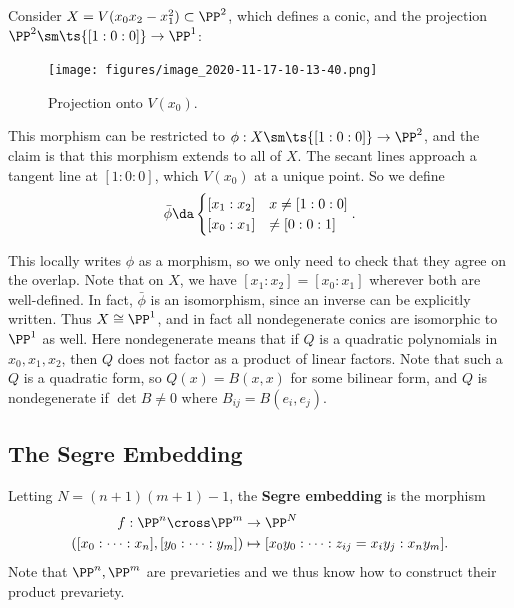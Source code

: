 \begin{example}[?]

Consider \(X = V(x_0 x_2 - x_1^2) \subset \PP^2\), which defines a
conic, and the projection \(\PP^2 \sm \ts{[1:0:0]} \to \PP^1\):

\begin{figure}
\centering
\texttt{[image: figures/image\_2020-11-17-10-13-40.png]}
\caption{Projection onto \(V(x_0)\).}
\end{figure}

This morphism can be restricted to \(\phi: X\sm\ts{[1:0:0]} \to \PP^2\),
and the claim is that this morphism extends to all of \(X\). The secant
lines approach a tangent line at \([1:0:0]\), which \(V(x_0)\) at a
unique point. So we define
\begin{align*}  
\bar \phi \da 
\begin{cases}
[x_1: x_2] & x \neq [1:0:0] \\
[x_0: x_1] & \neq [0:0:1]
\end{cases}
.\end{align*}

This locally writes \(\phi\) as a morphism, so we only need to check
that they agree on the overlap. Note that on \(X\), we have
\([x_1: x_2] = [x_0 : x_1]\) wherever both are well-defined. In fact,
\(\bar \phi\) is an isomorphism, since an inverse can be explicitly
written. Thus \(X\cong \PP^1\), and in fact all nondegenerate conics are
isomorphic to \(\PP^1\) as well. Here nondegenerate means that if \(Q\)
is a quadratic polynomials in \(x_0, x_1, x_2\), then \(Q\) does not
factor as a product of linear factors. Note that such a \(Q\) is a
quadratic form, so \(Q(x) = B(x, x)\) for some bilinear form, and \(Q\)
is nondegenerate if \(\det B \neq 0\) where \(B_{ij} = B(e_i, e_j)\).

\end{example}

\hypertarget{the-segre-embedding}{%
\subsection{The Segre Embedding}\label{the-segre-embedding}}

\begin{definition}

Letting \(N = (n+1)(m+1) - 1\), the \textbf{Segre embedding} is the
morphism
\begin{align*}  
f: \PP^n \cross \PP^m &\to \PP^N \\
([x_0: \cdots : x_n], [y_0: \cdots : y_m]) &\mapsto
[x_0 y_0 : \cdots : z_{ij} = x_i y_j : x_n y_m]
.\end{align*} Note that \(\PP^n, \PP^m\) are prevarieties and we thus
know how to construct their product prevariety.

\end{definition}

